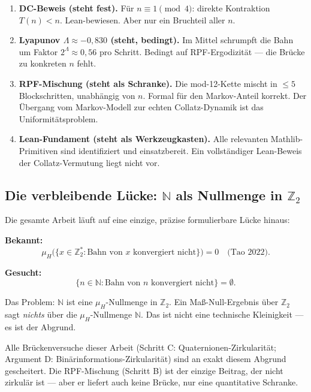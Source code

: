 \documentclass[12pt,a4paper]{article}
\newcommand{\N}{\mathbb{N}}
\newcommand{\Ztwo}{\mathbb{Z}_2}
\begin{document}
\begin{tcolorbox}[saeulen, title={Vier Säulen --- was steht, was wackelt}]
\begin{enumerate}[label=\textbf{Säule \arabic*:}, leftmargin=*, align=left,
    itemsep=4pt]
  \item \textbf{DC-Beweis (steht fest).} Für $n \equiv 1 \pmod{4}$: direkte
    Kontraktion $T(n) < n$. Lean-bewiesen. Aber nur ein Bruchteil aller $n$.

  \item \textbf{Lyapunov $\Lambda \approx -0{,}830$ (steht, bedingt).}
    Im Mittel schrumpft die Bahn um Faktor $2^\Lambda \approx 0{,}56$ pro
    Schritt. Bedingt auf RPF-Ergodizität --- die Brücke zu konkreten $n$
    fehlt.

  \item \textbf{RPF-Mischung (steht als Schranke).} Die mod-12-Kette mischt
    in $\leq 5$ Blockschritten, unabhängig von $n$. Formal für den Markov-Anteil
    korrekt. Der Übergang vom Markov-Modell zur echten Collatz-Dynamik ist
    das Uniformitätsproblem.

  \item \textbf{Lean-Fundament (steht als Werkzeugkasten).} Alle relevanten
    Mathlib-Primitiven sind identifiziert und einsatzbereit. Ein vollständiger
    Lean-Beweis der Collatz-Vermutung liegt nicht vor.
\end{enumerate}
\end{tcolorbox}

\subsection*{Die verbleibende Lücke: $\N$ als Nullmenge in $\Ztwo$}

\begin{tcolorbox}[frontlinie, title={Die Frontlinie: Eine Gleichung, eine Brücke}]
Die gesamte Arbeit läuft auf eine einzige, präzise formulierbare Lücke hinaus:

\medskip
\textbf{Bekannt:}
\[
  \mu_H\bigl(\{x \in \Ztwo^* : \text{Bahn von } x \text{ konvergiert nicht}\}\bigr) = 0
  \quad\text{(Tao 2022).}
\]

\textbf{Gesucht:}
\[
  \{n \in \N : \text{Bahn von } n \text{ konvergiert nicht}\} = \emptyset.
\]

\medskip
Das Problem: $\N$ ist eine $\mu_H$-Nullmenge in $\Ztwo$. Ein Maß-Null-Ergebnis
über $\Ztwo$ sagt \emph{nichts} über die $\mu_H$-Nullmenge $\N$. Das ist
nicht eine technische Kleinigkeit --- es ist der Abgrund.

\medskip
Alle Brückenversuche dieser Arbeit (Schritt C: Quaternionen-Zirkularität;
Argument D: Binärinformations-Zirkularität) sind an exakt diesem Abgrund
gescheitert. Die RPF-Mischung (Schritt B) ist der einzige Beitrag, der
nicht zirkulär ist --- aber er liefert auch keine Brücke, nur eine
quantitative Schranke.
\end{tcolorbox}
\end{document}
